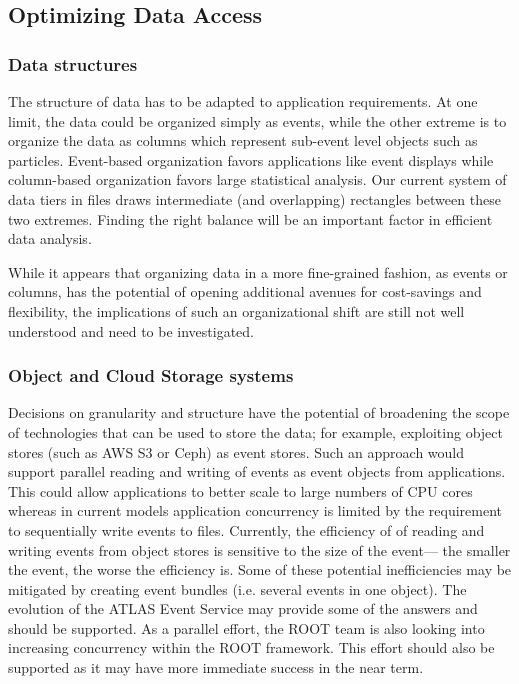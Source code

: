 \documentclass[12pt,a4paper]{article}
\begin{document}
\subsection{Optimizing Data Access}\label{optimizing-data-access}

\subsubsection{Data structures}\label{data-structures}

The structure of data has to be adapted to application requirements.
At one limit, the data could be organized simply as events, while the other
extreme is to organize the data as columns which represent sub-event
level objects such as particles. Event-based organization favors
applications like event displays while column-based organization favors
large statistical analysis. Our current system of data tiers in files
draws intermediate (and overlapping) rectangles between these two
extremes. Finding the right balance will be an important factor in
efficient data analysis.

While it appears that organizing data in a more fine-grained fashion, as
events or columns, has the potential of opening additional avenues for
cost-savings and flexibility, the implications of such an organizational
shift are still not well understood and need to be investigated.

\subsubsection{Object and Cloud Storage
systems}\label{object-and-cloud-storage-systems}

Decisions on granularity and structure have the potential of broadening
the scope of technologies that can be used to store the data; for
example, exploiting object stores (such as AWS S3 or Ceph) as event stores. Such an approach
would support parallel reading and writing of events as
event objects from applications. This could allow applications to better
scale to large numbers of CPU cores whereas in current models application
concurrency is limited by the requirement to sequentially write events
to files. Currently, the efficiency of of reading and writing events
from object stores is sensitive to the size of the event---
the smaller the event, the worse the efficiency is. Some of these potential inefficiencies
may be mitigated by creating event bundles (i.e. several events in one object). The
evolution of the ATLAS Event Service may provide some of the answers and
should be supported. As a parallel effort, the ROOT team is also looking
into increasing concurrency within the ROOT framework. This effort
should also be supported as it may have more immediate success in the
near term.
\end{document}
